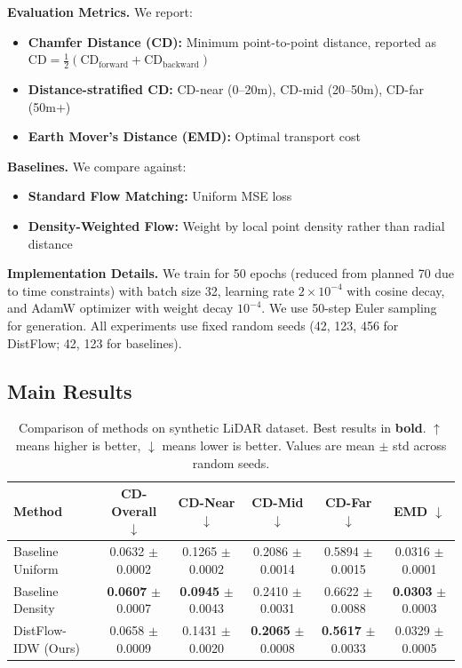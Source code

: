 \documentclass{article}
\begin{document}
\textbf{Evaluation Metrics.} We report:
\begin{itemize}
    \item \textbf{Chamfer Distance (CD):} Minimum point-to-point distance, reported as $\text{CD} = \frac{1}{2}(\text{CD}_{\text{forward}} + \text{CD}_{\text{backward}})$
    \item \textbf{Distance-stratified CD:} CD-near (0--20m), CD-mid (20--50m), CD-far (50m+)
    \item \textbf{Earth Mover's Distance (EMD):} Optimal transport cost
\end{itemize}

\textbf{Baselines.} We compare against:
\begin{itemize}
    \item \textbf{Standard Flow Matching:} Uniform MSE loss \citep{lipman2023flow}
    \item \textbf{Density-Weighted Flow:} Weight by local point density rather than radial distance
\end{itemize}

\textbf{Implementation Details.} We train for 50 epochs (reduced from planned 70 due to time constraints) with batch size 32, learning rate $2 \times 10^{-4}$ with cosine decay, and AdamW optimizer with weight decay $10^{-4}$. We use 50-step Euler sampling for generation. All experiments use fixed random seeds (42, 123, 456 for DistFlow; 42, 123 for baselines).

\subsection{Main Results}

\begin{table}[t]
\caption{Comparison of methods on synthetic LiDAR dataset. Best results in \textbf{bold}. $\uparrow$ means higher is better, $\downarrow$ means lower is better. Values are mean $\pm$ std across random seeds.}
\label{tab:main}
\centering
\begin{tabular}{lccccc}
\toprule
Method & CD-Overall $\downarrow$ & CD-Near $\downarrow$ & CD-Mid $\downarrow$ & CD-Far $\downarrow$ & EMD $\downarrow$ \\
\midrule
Baseline Uniform & 0.0632 $\pm$ 0.0002 & 0.1265 $\pm$ 0.0002 & 0.2086 $\pm$ 0.0014 & 0.5894 $\pm$ 0.0015 & 0.0316 $\pm$ 0.0001 \\
Baseline Density & \textbf{0.0607} $\pm$ 0.0007 & \textbf{0.0945} $\pm$ 0.0043 & 0.2410 $\pm$ 0.0031 & 0.6622 $\pm$ 0.0088 & \textbf{0.0303} $\pm$ 0.0003 \\
DistFlow-IDW (Ours) & 0.0658 $\pm$ 0.0009 & 0.1431 $\pm$ 0.0020 & \textbf{0.2065} $\pm$ 0.0008 & \textbf{0.5617} $\pm$ 0.0033 & 0.0329 $\pm$ 0.0005 \\
\bottomrule
\end{tabular}
\end{table}
\end{document}
